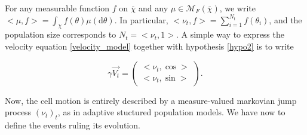 \documentclass[a4paper,11pt]{article}
\newcommand{\dx}{\textrm{d}}
\begin{document}
For any measurable function $f$ on $\overline{\chi}$ and any $\mu \in \mathcal{M}_F(\overline{\chi})$, we write $<\mu,f> = \int_{\chi} f(\theta) \mu(\dx \theta)$. In particular, $<\nu_t,f> = \sum_{i=1}^{N_t} f(\theta_i)$, and the population size corresponds to $N_t = <\nu_t,1>$.
A simple way to express the velocity equation \eqref{velocity_model} together with hypothesis \ref{hypo2} is to write

\begin{displaymath}
\gamma \vec{V_t} = \begin{pmatrix}
<\nu_t,\cos> \\ <\nu_t,\sin>
\end{pmatrix}.
\end{displaymath}

Now, the cell motion is entirely described by a measure-valued markovian jump process $(\nu_t)_t$, as in adaptive stuctured population models. We have now to define the events ruling its evolution. 
\end{document}
